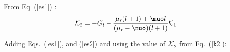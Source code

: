 From Eq. (\ref{es1}) :
\begin{equation}\label{k2}
\mathcal{K}_2=-G_l-\frac{\mu_r(l+1)+\muo l}{(\mu_r-\muo)(l+1)}\mathcal{K}_1
\end{equation}

Adding Eqs.~(\ref{es1}), and (\ref{es2}) and using the value of $\mathcal{K}_2$ from Eq.~(\ref{k2}):




